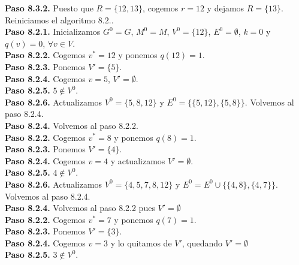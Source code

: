 \documentclass[12pt, oneside, a4paper]{article}
\begin{document}
{{\bf Paso 8.3.2.} Puesto que $R=\{12, 13\}$, cogemos $r=12$ y dejamos
$R=\{13\}$. Reiniciamos el algoritmo $8.2.$.\\

{\bf Paso 8.2.1.} Inicializamos $G^{0}=G$, $M^{0}=M$, $V^{0}=\{12\}$,
$E^{0}=\emptyset$, $k=0$ y $q(v)=0$, $\forall v\in V$.\\

{\bf Paso 8.2.2.} Cogemos $v^{*}=12$ y ponemos $q(12)=1$.\\

{\bf Paso 8.2.3.} Ponemos $V'=\{5\}$.\\

{\bf Paso 8.2.4.} Cogemos $v=5$, $V'=\emptyset$.\\

{\bf Paso 8.2.5.} $5\not\in V^{0}$.\\

{\bf Paso 8.2.6.} Actualizamos $V^{0}=\{5,8,12\}$ y
$E^{0}=\{\{5,12\},\{5,8\}\}$. Volvemos al paso 8.2.4.\\

{\bf Paso 8.2.4.} Volvemos al paso 8.2.2.\\

{\bf Paso 8.2.2.} Cogemos $v^{*}=8$ y ponemos $q(8)=1$.\\

{\bf Paso 8.2.3.} Ponemos $V'=\{4\}$.\\

{\bf Paso 8.2.4.} Cogemos $v=4$ y actualizamos $V'=\emptyset$.\\

{\bf Paso 8.2.5.} $4\not\in V^{0}$.\\

{\bf Paso 8.2.6.} Actualizamos $V^{0}=\{4,5,7,8,12\}$ y
$E^{0}=E^{0}\cup\{\{4,8\},\{4,7\}\}$. Volvemos al paso 8.2.4.\\

{\bf Paso 8.2.4.} Volvemos al paso 8.2.2 pues $V'=\emptyset$\\

{\bf Paso 8.2.2.} Cogemos $v^{*}=7$ y ponemos $q(7)=1$.\\

{\bf Paso 8.2.3.} Ponemos $V'=\{3\}$.\\

{\bf Paso 8.2.4.} Cogemos $v=3$ y lo quitamos de $V'$, quedando
$V'=\emptyset$\\

{\bf Paso 8.2.5.} $3\not\in V^{0}$.\\

}
\end{document}
